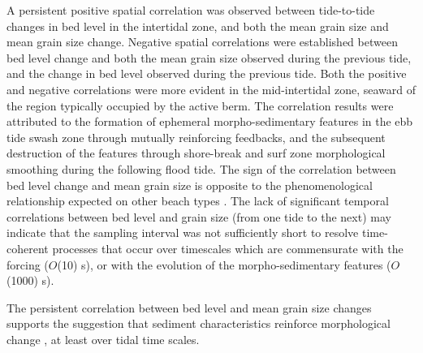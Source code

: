 A persistent positive spatial correlation was observed between tide-to-tide changes in bed level in the intertidal zone, and both the mean grain size and mean grain size change. Negative spatial correlations were established between bed level change and both the mean grain size observed during the previous tide, and the change in bed level observed during the previous tide. Both the positive and negative correlations were more evident in the mid-intertidal zone, seaward of the region typically occupied by the active berm. The correlation results were attributed to the formation of ephemeral morpho-sedimentary features in the ebb tide swash zone through mutually reinforcing feedbacks, and the subsequent destruction of the features through shore-break and surf zone morphological smoothing during the following flood tide. The sign of the correlation between bed level change and mean grain size is opposite to the phenomenological relationship expected on other beach types \citep[e.g.,][]{Masselink_etal2007}. The lack of significant temporal correlations between bed level and grain size (from one tide to the next) may indicate that the sampling interval was not sufficiently short to resolve time-coherent processes that occur over timescales which are commensurate with the forcing ($O$(10) s), or with the evolution of the morpho-sedimentary features ($O$(1000) s).

The persistent correlation between bed level and mean grain size changes supports the suggestion that sediment characteristics reinforce morphological change \citep[see][]{Buscombe_Masselink2006}, at least over tidal time scales.







%

